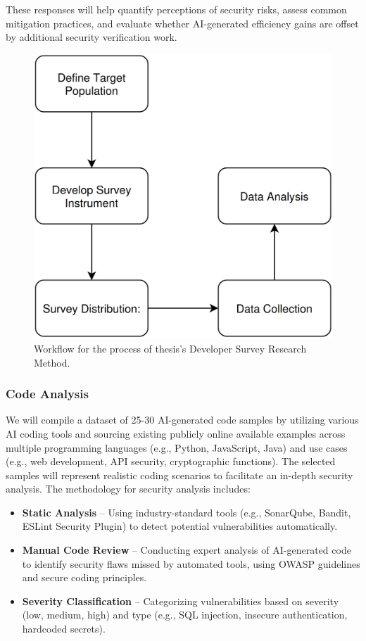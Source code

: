 These responses will help quantify perceptions of security risks, assess common mitigation practices, and evaluate whether AI-generated efficiency gains are offset by additional security verification work.


\begin{figure}[H]
    \centering
    \includegraphics[width=0.9\columnwidth]{assets/survay-workflow.png}
    \caption{Workflow for the process of thesis's Developer Survey Research Method.}
    \label{fig:workflow_diagram}
\end{figure}

\subsubsection{Code Analysis}

We will compile a dataset of 25-30 AI-generated code samples by utilizing various AI coding tools and sourcing existing publicly online available examples across multiple programming languages (e.g., Python, JavaScript, Java) and use cases (e.g., web development, API security, cryptographic functions). The selected samples will represent realistic coding scenarios to facilitate an in-depth security analysis.
The methodology for security analysis includes:

\begin{itemize}
    \item \textbf{Static Analysis} – Using industry-standard tools (e.g., SonarQube, Bandit, ESLint Security Plugin) to detect potential vulnerabilities automatically.
    \item \textbf{Manual Code Review} – Conducting expert analysis of AI-generated code to identify security flaws missed by automated tools, using OWASP guidelines and secure coding principles.
    \item \textbf{Severity Classification} – Categorizing vulnerabilities based on severity (low, medium, high) and type (e.g., SQL injection, insecure authentication, hardcoded secrets).
\end{itemize}

